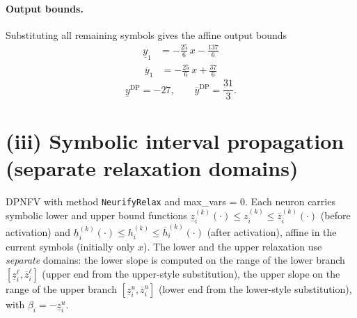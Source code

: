\documentclass[11pt]{article}
\begin{document}
\paragraph{Output bounds.}
Substituting all remaining symbols gives the affine output bounds
\begin{align*}
\underline{y}_{1} &= -\frac{25}{6}\,x - \frac{137}{6}
\end{align*}
\begin{align*}
\overline{y}_{1} &= -\frac{25}{6}\,x + \frac{37}{6}
\end{align*}
\begin{equation*}
\underline{y}^{\text{DP}} = -27, \qquad \overline{y}^{\text{DP}} = \frac{31}{3}.
\end{equation*}

\section{(iii) Symbolic interval propagation (separate relaxation domains)}
DPNFV with method \texttt{NeurifyRelax} and max\_vars = 0. Each neuron carries symbolic lower and upper bound functions
$\underline{z}^{(k)}_i(\cdot) \le z^{(k)}_i \le \overline{z}^{(k)}_i(\cdot)$ (before activation)
and $\underline{h}^{(k)}_i(\cdot) \le h^{(k)}_i \le \overline{h}^{(k)}_i(\cdot)$ (after activation),
affine in the current symbols (initially only $x$).
The lower and the upper relaxation use \emph{separate} domains:
the lower slope is computed on the range of the lower branch
$[\underline{z}^{\ell}_i, \overline{z}^{\ell}_i]$ (upper end from the upper-style substitution),
the upper slope on the range of the upper branch
$[\underline{z}^{u}_i, \overline{z}^{u}_i]$ (lower end from the lower-style substitution),
with $\beta_i = -\underline{z}^{u}_i$.
\end{document}
